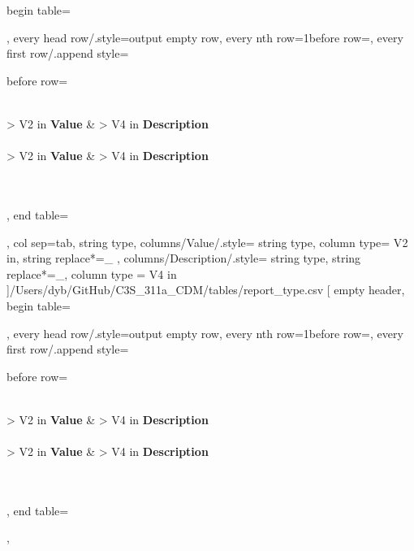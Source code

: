 \documentclass[a4paper]{article}
\begin{document}
    begin table=\begin{longtable},
    every head row/.style={output empty row},
    every nth row={1}{before row=\hline},
    every first row/.append style={
        before row={%
            \caption{Report type}
            \label{tab:DataTable}\\
            \hline\hline {} { > {\centering}V{2 in}} { \textbf{Value}} &  { > {\centering} V{4 in} } {\textbf{Description}} \\ \hline\hline \endfirsthead
             \\
            \hline\hline {} { > {\centering}V{2 in} } { \textbf{Value}} &  { > {\centering} V{4 in} } {\textbf{Description}} \\ \hline\hline \endhead
             \\
            \endfoot
            \hline
             \\ 
            \endlastfoot
        }
    },
    end table=\end{longtable},
    col sep=tab,
    string type,
    columns/Value/.style={
            string type, 
            column type= V{2 in}, 
            string replace*={_}{}
        },
    columns/Description/.style={
            string type, 
            string replace*={_}{},
            column type = V{4 in}
        }
    ]{/Users/dyb/GitHub/C3S_311a_CDM/tables/report_type.csv}
\pgfplotstabletypeset[
    empty header,
    begin table=\begin{longtable},
    every head row/.style={output empty row},
    every nth row={1}{before row=\hline},
    every first row/.append style={
        before row={%
            \caption{Sea level datum}
            \label{tab:DataTable}\\
            \hline\hline {} { > {\centering}V{2 in}} { \textbf{Value}} &  { > {\centering} V{4 in} } {\textbf{Description}} \\ \hline\hline \endfirsthead
             \\
            \hline\hline {} { > {\centering}V{2 in} } { \textbf{Value}} &  { > {\centering} V{4 in} } {\textbf{Description}} \\ \hline\hline \endhead
             \\
            \endfoot
            \hline
             \\ 
            \endlastfoot
        }
    },
    end table=\end{longtable},
\end{document}
